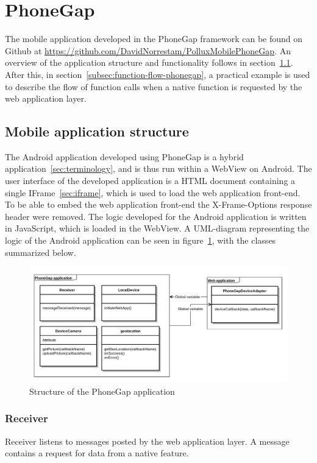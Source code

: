 \section{PhoneGap}\label{sec:phonegap}
The mobile application developed in the PhoneGap framework can be found on Github at \url{https://github.com/DavidNorrestam/PolluxMobilePhoneGap}. An overview of the application structure and functionality follows in section~\ref{subsec:application-structure-phonegap}. After this, in section~\ref{subsec:function-flow-phonegap}, a practical example is used to describe the flow of function calls when a native function is requested by the web application layer.


\subsection{Mobile application structure} \label{subsec:application-structure-phonegap}
The Android application developed using PhoneGap is a hybrid application~\ref{sec:terminology}, and is thus run within a WebView on Android. The user interface of the developed application is a HTML document containing a single IFrame~\ref{sec:iframe}, which is used to load the web application front-end. To be able to embed the web application front-end the X-Frame-Options response header were removed. The logic developed for the Android application is written in JavaScript, which is loaded in the WebView. A UML-diagram representing the logic of the Android application can be seen in figure~\ref{fig:phonegapuml}, with the classes summarized below.
\begin{figure}[h!]
	\centering
    \includegraphics[width=150mm,natwidth=1000,natheight=750]{./img/phonegapuml.png}
    \caption{Structure of the PhoneGap application}
    \label{fig:phonegapuml}
\end{figure}

\subsubsection{Receiver}
Receiver listens to messages posted by the web application layer. A message contains a request for data from a native feature.
\label{fig:phonegapflow}
